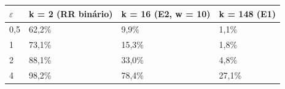 \begin{tabular}{llll}
\toprule
$\varepsilon$ & k = 2 (RR binário) & k = 16 (E2, w = 10) & k = 148 (E1) \\
\midrule
0,5 & 62,2\% & 9,9\% & 1,1\% \\
1 & 73,1\% & 15,3\% & 1,8\% \\
2 & 88,1\% & 33,0\% & 4,8\% \\
4 & 98,2\% & 78,4\% & 27,1\% \\
\bottomrule
\end{tabular}
